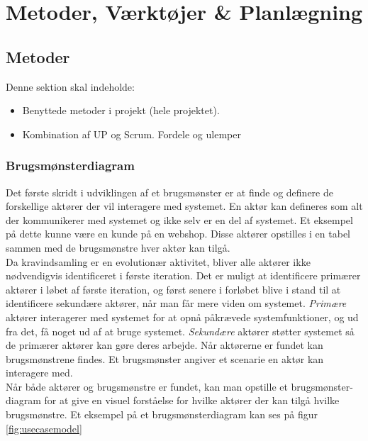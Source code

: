\section{Metoder, Værktøjer \& Planlægning}

\subsection{Metoder}
Denne sektion skal indeholde:

\begin{itemize}
    \item Benyttede metoder i projekt (hele projektet).
    \item Kombination af UP og Scrum. Fordele og ulemper
\end{itemize}


\subsubsection{Brugsmønsterdiagram}
Det første skridt i udviklingen af et brugsmønster er at finde og definere de forskellige aktører der vil interagere med systemet. En aktør kan defineres som alt der kommunikerer med systemet og ikke selv er en del af systemet. Et eksempel på dette kunne være en kunde på en webshop. Disse aktører opstilles i en tabel sammen med de brugsmønstre hver aktør kan tilgå. \\

\noindent
Da kravindsamling er en evolutionær aktivitet, bliver alle aktører ikke nødvendigvis identificeret i første iteration. Det er muligt at identificere primærer aktører i løbet af første iteration, og først senere i forløbet blive i stand til at identificere sekundære aktører, når man får mere viden om systemet. \textit{Primære} aktører interagerer med systemet for at opnå påkrævede systemfunktioner, og ud fra det, få noget ud af at bruge systemet. \textit{Sekundære} aktører støtter systemet så de primærer aktører kan gøre deres arbejde. Når aktørerne er fundet kan brugsmønstrene findes. Et brugsmønster angiver et scenarie en aktør kan interagere med. \\

\noindent
Når både aktører og brugsmønstre er fundet, kan man opstille et brugsmønster-diagram for at give en visuel forståelse for hvilke aktører der kan tilgå hvilke brugsmønstre. Et eksempel på et brugsmønsterdiagram kan ses på figur \ref{fig:usecasemodel} \\

